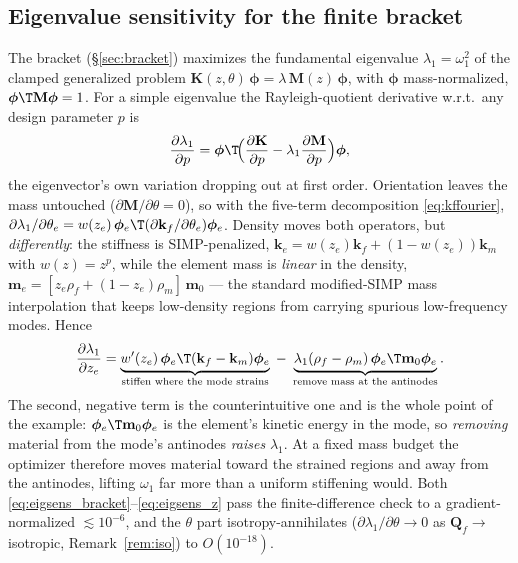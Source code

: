 \documentclass[11pt]{article}
\begin{document}
\subsection{Eigenvalue sensitivity for the finite bracket}
\label{app:modalsens}
The bracket (\S\ref{sec:bracket}) maximizes the fundamental eigenvalue
$\lambda_1=\omega_1^2$ of the clamped generalized problem
$\mathbf K(z,\theta)\,\bm\phi=\lambda\,\mathbf M(z)\,\bm\phi$, with $\bm\phi$
mass-normalized, $\bm\phi\T\mathbf M\bm\phi=1$. For a simple eigenvalue the
Rayleigh-quotient derivative w.r.t.\ any design parameter $p$ is
\begin{equation}
  \frac{\partial\lambda_1}{\partial p}
   =\bm\phi\T\!\Bigl(\frac{\partial\mathbf K}{\partial p}
     -\lambda_1\frac{\partial\mathbf M}{\partial p}\Bigr)\bm\phi ,
  \label{eq:eigsens_bracket}
\end{equation}
the eigenvector's own variation dropping out at first order. Orientation leaves the
mass untouched ($\partial\mathbf M/\partial\theta=0$), so with the five-term
decomposition \eqref{eq:kffourier},
$\partial\lambda_1/\partial\theta_e
  =w(z_e)\,\bm\phi_e\T(\partial\mathbf k_f/\partial\theta_e)\bm\phi_e$.
Density moves both operators, but \emph{differently}: the stiffness is SIMP-penalized,
$\mathbf k_e=w(z_e)\mathbf k_f+(1-w(z_e))\mathbf k_m$ with $w(z)=z^{p}$, while the
element mass is \emph{linear} in the density,
$\mathbf m_e=[z_e\rho_f+(1-z_e)\rho_m]\,\mathbf m_0$ --- the standard modified-SIMP
mass interpolation that keeps low-density regions from carrying spurious low-frequency
modes. Hence
\begin{equation}
  \frac{\partial\lambda_1}{\partial z_e}
   =\underbrace{w'(z_e)\,\bm\phi_e\T(\mathbf k_f-\mathbf k_m)\bm\phi_e}
     _{\text{stiffen where the mode strains}}
   \;-\;\underbrace{\lambda_1(\rho_f-\rho_m)\,\bm\phi_e\T\mathbf m_0\bm\phi_e}
     _{\text{remove mass at the antinodes}} .
  \label{eq:eigsens_z}
\end{equation}
The second, negative term is the counterintuitive one and is the whole point of the
example: $\bm\phi_e\T\mathbf m_0\bm\phi_e$ is the element's kinetic energy in the mode,
so \emph{removing} material from the mode's antinodes \emph{raises} $\lambda_1$. At a
fixed mass budget the optimizer therefore moves material toward the strained regions
and away from the antinodes, lifting $\omega_1$ far more than a uniform stiffening
would. Both \eqref{eq:eigsens_bracket}--\eqref{eq:eigsens_z} pass the
finite-difference check to a gradient-normalized $\lesssim10^{-6}$, and the $\theta$
part isotropy-annihilates ($\partial\lambda_1/\partial\theta\to0$ as
$\mathbf Q_f\to$ isotropic, Remark~\ref{rem:iso}) to $O(10^{-18})$.
\end{document}
